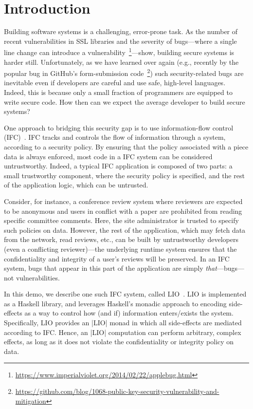 \section{Introduction}
\label{sec:intro}

Building software systems is a challenging, error-prone task.
%
As the number of recent vulnerabilities in SSL libraries and the
severity of bugs---where a single line change can introduce a
vulnerability~\footnote{\url{https://www.imperialviolet.org/2014/02/22/applebug.html}}---show, building secure systems is harder
still.
%
Unfortunately, as we have learned over again (e.g., recently by the
popular bug in GitHub's form-submission
code~\footnote{\url{https://github.com/blog/1068-public-key-security-vulnerability-and-mitigation}}) such
security-related bugs are inevitable even if developers are careful
and use safe, high-level languages.
%
Indeed, this is because only a small fraction of programmers are
equipped to write secure code.
%
How then can we expect the average developer to build secure systems?
 
One approach to bridging this security gap is to use
information-flow control (IFC)~\cite{sabelfeld:language-based-iflow}.
%
IFC tracks and controls the flow of information through a system,
according to a security policy.
%
By ensuring that the policy associated with a piece data is always
enforced, most code in a IFC system can be considered untrustworthy.
%
Indeed, a typical IFC application is composed of two parts: a small
trustworthy component, where the security policy is specified, and the
rest of the application logic, which can be untrusted.
%

%
Consider, for instance, a conference review system where reviewers are
expected to be anonymous and users in conflict with a paper are
prohibited from reading specific committee comments.
%
Here, the site administrator is trusted to specify such policies on
data. 
%
However, the rest of the application, which may fetch data from the
network, read reviews, etc., can be built by untrustworthy developers
(even a conflicting reviewer)---the underlying runtime system ensures
that the confidentiality and integrity of a user's reviews will be
preserved.
%
In an IFC system, bugs that appear in this part of the application
are simply \emph{that}---bugs---not vulnerabilities.

In this demo, we describe one such IFC system, called
LIO~\cite{lio, concurrent-lio}.
%
LIO is implemented as a Haskell library, and leverages Haskell's
monadic approach to encoding side-effects as a way to control how (and
if) information enters/exists the system.
%
Specifically, LIO provides an \hs|LIO| monad in which
all side-effects are mediated according to IFC.
%
Hence, an \hs|LIO| computation can perform arbitrary, complex effects,
as long as it does not violate the confidentiality or integrity
policy on data.
%
